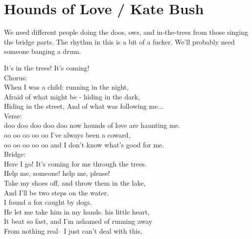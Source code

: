 \section{Hounds of Love / Kate Bush}\label{sec:hounds_of_love}
  {\small We need different people doing the doos, ows, and in-the-trees from those singing the bridge parts. The rhythm in this is a bit of a fucker. We'll probably need someone banging a drum.}
  
  \Fmajor
  \Cmajor
  \BflatMajor
  \Aminor
  
  It's in the trees!
  It's coming!\\
  Chorus:\\
  When I was a child:
  running in the night,\\
  Afraid of what might be -
  hiding in the dark,\\
  Hiding in the street,
  And of what was following me...\\
  Verse:\\
  doo doo doo doo doo
  now hounds of love are haunting me. \\
  oo oo oo oo oo 
  I've always been a coward,\\
  oo oo oo oo oo 
  and I don't know what's good for me.\\
  Bridge:\\
  Here I go!
  It's coming for me through the trees.\\
  Help me, someone!
  help me, please!\\
  Take my shoes off,
  and throw them in the lake,\\
  And I'll be
  two steps on the water.\\
  I found a fox
  caught by dogs.\\
  He let me take him in my hands.
  his little heart,\\
  It beat so fast,
  and I'm ashamed of running away\\
  From nothing real--
  I just can't deal with this,\\
